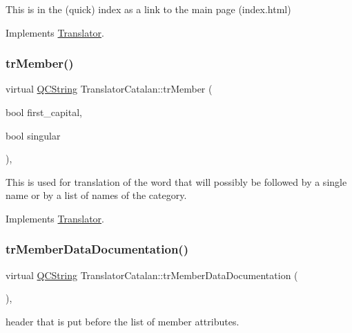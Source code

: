 This is in the (quick) index as a link to the main page (index.\+html) 

Implements \mbox{\hyperlink{class_translator}{Translator}}.

\mbox{\label{class_translator_catalan_a1f49972fab87b0e8443d4d839a2893f4}} 
\subsubsection{\texorpdfstring{trMember()}{trMember()}}
{\footnotesize\ttfamily virtual \mbox{\hyperlink{class_q_c_string}{Q\+C\+String}} Translator\+Catalan\+::tr\+Member (\begin{DoxyParamCaption}\item[{bool}]{first\+\_\+capital,  }\item[{bool}]{singular }\end{DoxyParamCaption})\hspace{0.3cm}{\ttfamily [inline]}, {\ttfamily [virtual]}}

This is used for translation of the word that will possibly be followed by a single name or by a list of names of the category. 

Implements \mbox{\hyperlink{class_translator}{Translator}}.

\mbox{\label{class_translator_catalan_a8f6fb728728ab79c25f26ec306b0de89}} 
\subsubsection{\texorpdfstring{trMemberDataDocumentation()}{trMemberDataDocumentation()}}
{\footnotesize\ttfamily virtual \mbox{\hyperlink{class_q_c_string}{Q\+C\+String}} Translator\+Catalan\+::tr\+Member\+Data\+Documentation (\begin{DoxyParamCaption}{ }\end{DoxyParamCaption})\hspace{0.3cm}{\ttfamily [inline]}, {\ttfamily [virtual]}}

header that is put before the list of member attributes. 

